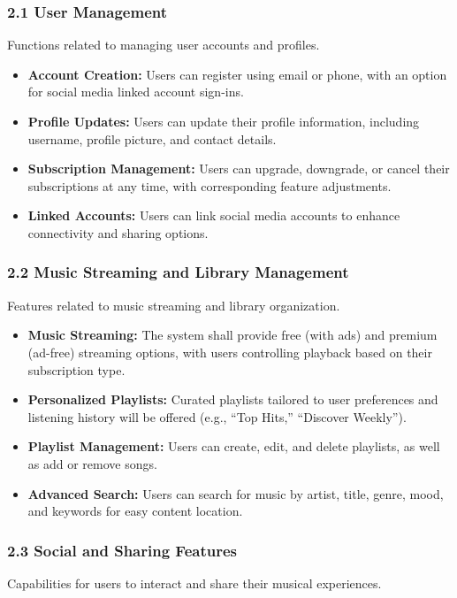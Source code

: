 \documentclass[a4paper,10pt]{article}
\begin{document}
\subsubsection*{2.1 User Management}
Functions related to managing user accounts and profiles.

\begin{itemize}[leftmargin=*]
    \item \textbf{Account Creation:} Users can register using email or phone, with an option for social media linked account sign-ins.
    \item \textbf{Profile Updates:} Users can update their profile information, including username, profile picture, and contact details.
    \item \textbf{Subscription Management:} Users can upgrade, downgrade, or cancel their subscriptions at any time, with corresponding feature adjustments.
    \item \textbf{Linked Accounts:} Users can link social media accounts to enhance connectivity and sharing options.
\end{itemize}

\subsubsection*{2.2 Music Streaming and Library Management}
Features related to music streaming and library organization.

\begin{itemize}[leftmargin=*]
    \item \textbf{Music Streaming:} The system shall provide free (with ads) and premium (ad-free) streaming options, with users controlling playback based on their subscription type.
    \item \textbf{Personalized Playlists:} Curated playlists tailored to user preferences and listening history will be offered (e.g., “Top Hits,” “Discover Weekly”).
    \item \textbf{Playlist Management:} Users can create, edit, and delete playlists, as well as add or remove songs.
    \item \textbf{Advanced Search:} Users can search for music by artist, title, genre, mood, and keywords for easy content location.
\end{itemize}

\subsubsection*{2.3 Social and Sharing Features}
Capabilities for users to interact and share their musical experiences.
\end{document}
